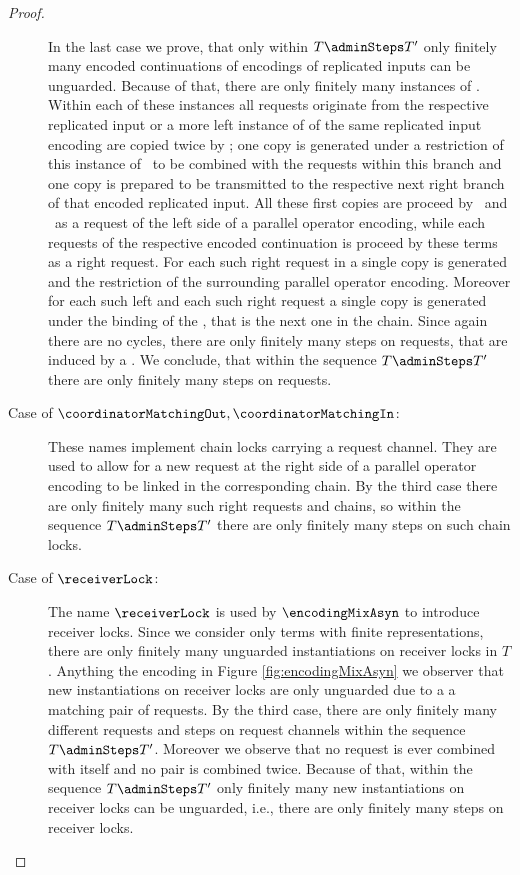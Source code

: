 \documentclass[]{llncs}
\begin{document}
\begin{proof}
\begin{description}
			In the last case we prove, that only within $ T \adminSteps T' $ only finitely many encoded continuations of encodings of replicated inputs can be unguarded. Because of that, there are only finitely many instances of \encodedContinuation. Within each of these instances all requests originate from the respective replicated input or a more left instance of \encodedContinuation of the same replicated input encoding are copied twice by \pushRequestsIn; one copy is generated under a restriction of this instance of \encodedContinuation \ to be combined with the requests within this branch and one copy is prepared to be transmitted to the respective next right branch of that encoded replicated input. All these first copies are proceed by \processRightOutputRequests \ and \processRightInputRequests \ as a request of the left side of a parallel operator encoding, while each requests of the respective encoded continuation is proceed by these terms as a right request. For each such right request in \pushRequestsOut a single copy is generated and the restriction of the surrounding parallel operator encoding. Moreover for each such left and each such right request a single copy is generated under the binding of the \encodedContinuation, that is the next one in the chain. Since again there are no cycles, there are only finitely many steps on requests, that are induced by a \encodedContinuation. We conclude, that within the sequence $ T \adminSteps T' $ there are only finitely many steps on requests.
		\item[Case of $ \coordinatorMatchingOut, \coordinatorMatchingIn $:] These names implement chain locks carrying a request channel. They are used to allow for a new request at the right side of a parallel operator encoding to be linked in the corresponding chain. By the third case there are only finitely many such right requests and chains, so within the sequence $ T \adminSteps T' $ there are only finitely many steps on such chain locks.
		\item[Case of $ \receiverLock $:] The name $ \receiverLock $ is used by $ \encodingMixAsyn $ to introduce receiver locks. Since we consider only terms with finite representations, there are only finitely many unguarded instantiations on receiver locks in $ T $. Anything the encoding in Figure \ref{fig:encodingMixAsyn} we observer that new instantiations on receiver locks are only unguarded due to a a matching pair of requests. By the third case, there are only finitely many different requests and steps on request channels within the sequence $ T \adminSteps T' $. Moreover we observe that no request is ever combined with itself and no pair is combined twice. Because of that, within the sequence $ T \adminSteps T' $ only finitely many new instantiations on receiver locks can be unguarded, i.e., there are only finitely many steps on receiver locks.
			

\end{description}
\end{proof}
\end{document}
